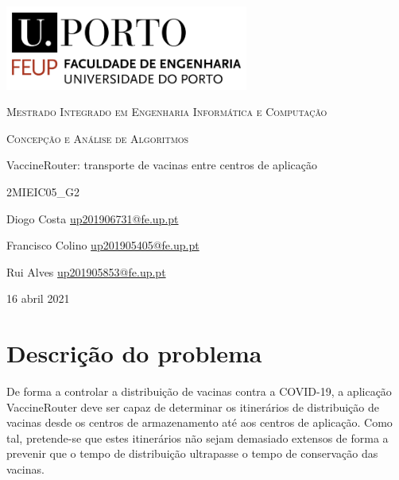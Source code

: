 \documentclass[12pt,a4paper]{report}
\begin{document}
\begin{titlepage}
	\centering
	\includegraphics[width=0.6\textwidth]{feup.png}\par\vspace{1cm}
	{\scshape Mestrado Integrado em Engenharia Informática e Computação \par}
	\vspace{1cm}
	{\scshape Concepção e Análise de Algoritmos \par}
	\vspace{1.5cm}
	{\huge VaccineRouter: transporte de vacinas entre centros de aplicação \par}
	\vspace{5cm}
	
	{\scshape 2MIEIC05\_G2 \par}
	\vspace{0.5cm}

	{ Diogo Costa \href{mailto:up201906731@fe.up.pt}{up201906731@fe.up.pt} \par}
	{ Francisco Colino \href{mailto:up201905405@fe.up.pt}{up201905405@fe.up.pt} \par}
	{ Rui Alves \href{mailto:up201905853@fe.up.pt}{up201905853@fe.up.pt} \par}
	\vspace{2cm}
	

	{\large 16 abril 2021\par}
\end{titlepage}


\tableofcontents{}
\newpage

\chapter{Descrição do problema}
De forma a controlar a distribuição de vacinas contra a COVID-19, a aplicação VaccineRouter deve ser capaz de determinar os itinerários de distribuição de vacinas desde os centros de armazenamento até aos centros de aplicação. Como tal, pretende-se que estes itinerários não sejam demasiado extensos de forma a prevenir que o tempo de distribuição ultrapasse o tempo de conservação das vacinas.
\end{document}
